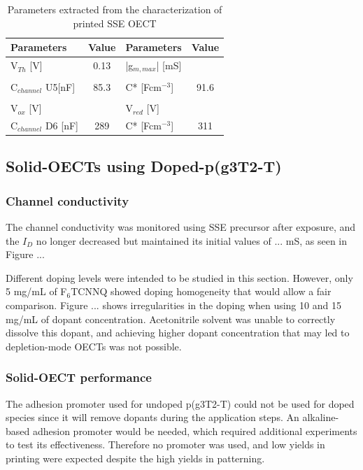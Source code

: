 \begin{table}[ht]
\centering
\caption{Parameters extracted from the characterization of printed SSE OECT}
\begin{tabular}{l|c||l|c}
Parameters & Value & Parameters & Value \\\hline \hline
V$_{Th}$ [V] &  0.13 & |g$_{m,max}$| [mS] & \\
& & &\\[-1em]
C$_{channel}$ U5[nF] & 85.3 & C* [Fcm$^{-3}$] & 91.6 \\
& & &\\[-1em]
V$_{ox}$ [V] &  & V$_{red}$ [V] &  \\\hline
C$_{channel}$ D6 [nF] & 289 & C* [Fcm$^{-3}$] & 311 \\\hline
\end{tabular}
\label{tab:printedfom}
\end{table}


\subsection{Solid-OECTs using Doped-p(g3T2-T)} \label{dopedOECTs}

\subsubsection{Channel conductivity}
The channel conductivity was monitored using SSE precursor after exposure, and the $I_{D}$ no longer decreased but maintained its initial values of ... mS, as seen in Figure ...

Different doping levels were intended to be studied in this section. However, only 5 mg/mL of F$_{6}$TCNNQ showed doping homogeneity that would allow a fair comparison. Figure ... shows irregularities in the doping when using 10 and 15 mg/mL of dopant concentration. Acetonitrile solvent was unable to correctly dissolve this dopant, and achieving higher dopant concentration that may led to depletion-mode OECTs was not possible.

\subsubsection{Solid-OECT performance}

The adhesion promoter used for undoped p(g3T2-T) could not be used for doped species since it will remove dopants during the application steps. An alkaline-based adhesion promoter would be needed, which required additional experiments to test its effectiveness. Therefore no promoter was used, and low yields in printing were expected despite the high yields in patterning.

